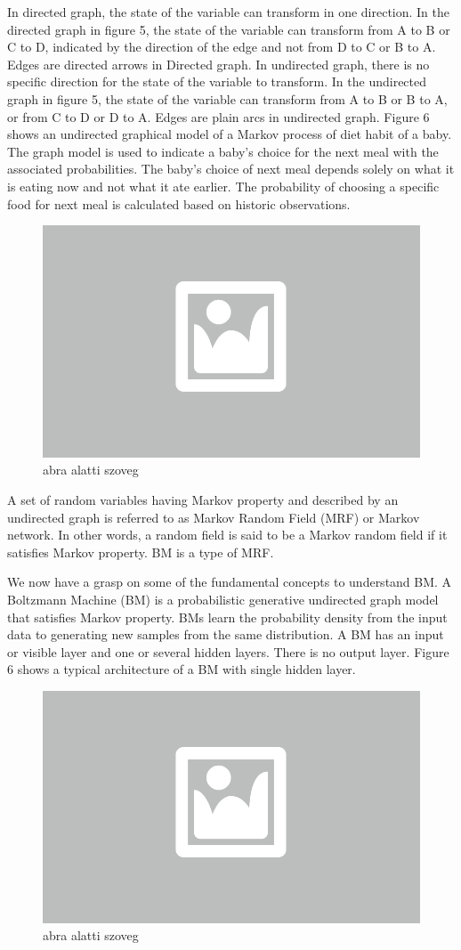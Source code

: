 In directed graph, the state of the variable can transform in one direction. In the directed graph in figure 5, the state of the variable can transform from A to B or C to D, indicated by the direction of the edge and not from D to C or B to A. Edges are directed arrows in Directed graph. In undirected graph, there is no specific direction for the state of the variable to transform. In the undirected graph in figure 5, the state of the variable can transform from A to B or B to A, or from C to D or D to A. Edges are plain arcs in undirected graph. Figure 6 shows an undirected graphical model of a Markov process of diet habit of a baby. The graph model is used to indicate a baby’s choice for the next meal with the associated probabilities. The baby’s choice of next meal depends solely on what it is eating now and not what it ate earlier. The probability of choosing a specific food for next meal is calculated based on historic observations.

\begin{figure}[h]
	\centering
	\includegraphics[width=0.65\columnwidth]{figures/abra.png}
	\caption{abra alatti szoveg}
\end{figure}

A set of random variables having Markov property and described by an undirected graph is referred to as Markov Random Field (MRF) or Markov network. In other words, a random field is said to be a Markov random field if it satisfies Markov property. BM is a type of MRF.

We now have a grasp on some of the fundamental concepts to understand BM. A Boltzmann Machine (BM) is a probabilistic generative undirected graph model that satisfies Markov property. BMs learn the probability density from the input data to generating new samples from the same distribution.  A BM has an input or visible layer and one or several hidden layers. There is no output layer. Figure 6 shows a typical architecture of a BM with single hidden layer. 

\begin{figure}[h]
	\centering
	\includegraphics[width=0.65\columnwidth]{figures/abra.png}
	\caption{abra alatti szoveg}
\end{figure}

